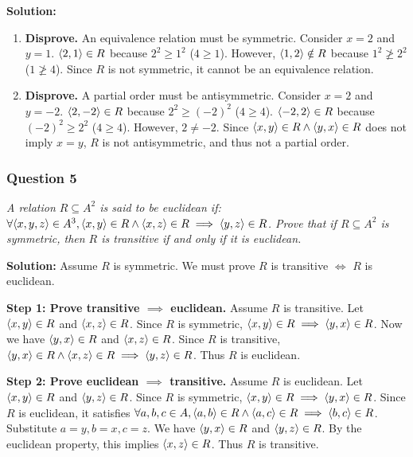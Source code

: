 \documentclass[
	letterpaper, %
	11pt, %
]{CSUniSchoolLabReport}
\newcommand{\tuple}[1]{\ensuremath{\left\langle #1 \right\rangle}\xspace}
\let\originalleft\left
\let\originalright\right
\renewcommand{\left}{\mathopen{}\mathclose\bgroup\originalleft}
\renewcommand{\right}{\aftergroup\egroup\originalright}
\begin{document}
\textbf{Solution:}
\begin{enumerate}
    \item \textbf{Disprove.} An equivalence relation must be symmetric.
    Consider $x = 2$ and $y = 1$.
    $\tuple{2,1} \in R$ because $2^2 \ge 1^2$ ($4 \ge 1$).
    However, $\tuple{1,2} \notin R$ because $1^2 \not\ge 2^2$ ($1 \not\ge 4$).
    Since $R$ is not symmetric, it cannot be an equivalence relation.

    \item \textbf{Disprove.} A partial order must be antisymmetric.
    Consider $x = 2$ and $y = -2$.
    $\tuple{2,-2} \in R$ because $2^2 \ge (-2)^2$ ($4 \ge 4$).
    $\tuple{-2,2} \in R$ because $(-2)^2 \ge 2^2$ ($4 \ge 4$).
    However, $2 \neq -2$. Since $\tuple{x,y} \in R \land \tuple{y,x} \in R$ does not imply $x = y$, $R$ is not antisymmetric, and thus not a partial order.
\end{enumerate}

\subsubsection*{Question 5}
\textit{A relation $R\subseteq A^2$ is said to be \emph{euclidean} if: $\forall \tuple{x,y,z}\in A^3, \tuple{x,y}\in R \wedge \tuple{x,z}\in R \implies \tuple{y,z}\in R$.
Prove that if $R\subseteq A^2$ is symmetric, then $R$ is transitive if and only if it is euclidean.}

\textbf{Solution:}
Assume $R$ is symmetric. We must prove $R$ is transitive $\iff$ $R$ is euclidean.

\textbf{Step 1: Prove transitive $\implies$ euclidean.}
Assume $R$ is transitive. Let $\tuple{x,y} \in R$ and $\tuple{x,z} \in R$.
Since $R$ is symmetric, $\tuple{x,y} \in R \implies \tuple{y,x} \in R$.
Now we have $\tuple{y,x} \in R$ and $\tuple{x,z} \in R$.
Since $R$ is transitive, $\tuple{y,x} \in R \land \tuple{x,z} \in R \implies \tuple{y,z} \in R$.
Thus $R$ is euclidean.

\textbf{Step 2: Prove euclidean $\implies$ transitive.}
Assume $R$ is euclidean. Let $\tuple{x,y} \in R$ and $\tuple{y,z} \in R$.
Since $R$ is symmetric, $\tuple{x,y} \in R \implies \tuple{y,x} \in R$.
Since $R$ is euclidean, it satisfies $\forall a,b,c \in A, \tuple{a,b} \in R \land \tuple{a,c} \in R \implies \tuple{b,c} \in R$.
Substitute $a = y, b = x, c = z$.
We have $\tuple{y,x} \in R$ and $\tuple{y,z} \in R$.
By the euclidean property, this implies $\tuple{x,z} \in R$.
Thus $R$ is transitive.
\end{document}
